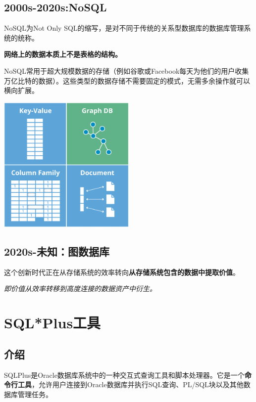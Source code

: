 \documentclass[11pt, a4paper, oneside, UTF8]{ctexbook}
\let\kaishu\relax %
\begin{document}
\subsection{2000s-2020s:NoSQL}
NoSQL为Not Only SQL的缩写，是对不同于传统的关系型数据库的数据库管理系统的统称。

{\bfseries\kaishu 网络上的数据本质上不是表格的结构。}

NoSQL常用于超大规模数据的存储（例如谷歌或Facebook每天为他们的用户收集万亿比特的数据）。这些类型的数据存储不需要固定的模式，无需多余操作就可以横向扩展。

\begin{center}
  \begin{minipage}{\textwidth}
    \center
    \includegraphics[width=0.5\textwidth]{picture/NoSQL数据库示意图.png}
    \captionsetup{hypcap=false}
    \label{fig:NosqlDatabase}
  \end{minipage}
\end{center}

\subsection{2020s-未知：图数据库}
这个创新时代正在从存储系统的效率转向\textbf{从存储系统包含的数据中提取价值}。

\textit{即价值从效率转移到高度连接的数据资产中衍生。}

\section{SQL*Plus工具}
\subsection{介绍}
SQLPlus是Oracle数据库系统中的一种交互式查询工具和脚本处理器。它是一个{\bfseries\kaishu 命令行工具}，允许用户连接到Oracle数据库并执行SQL查询、PL/SQL块以及其他数据库管理任务。
\end{document}
